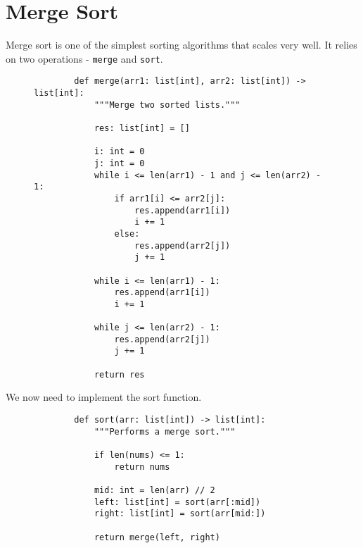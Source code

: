 
\section{Merge Sort}

Merge sort is one of the simplest sorting algorithms that scales very well. It
relies on two operations - \texttt{merge} and
\texttt{sort}.

\begin{figure}[H]
    \centering
    \begin{verbatim}
        def merge(arr1: list[int], arr2: list[int]) -> list[int]:
            """Merge two sorted lists."""

            res: list[int] = []

            i: int = 0
            j: int = 0
            while i <= len(arr1) - 1 and j <= len(arr2) - 1:
                if arr1[i] <= arr2[j]:
                    res.append(arr1[i])
                    i += 1
                else:
                    res.append(arr2[j])
                    j += 1
            
            while i <= len(arr1) - 1:
                res.append(arr1[i])
                i += 1

            while j <= len(arr2) - 1:
                res.append(arr2[j])
                j += 1

            return res
    \end{verbatim}
\end{figure}

We now need to implement the sort function.

\begin{figure}[H]
    \centering
    \begin{verbatim}
        def sort(arr: list[int]) -> list[int]:
            """Performs a merge sort."""

            if len(nums) <= 1:
                return nums
            
            mid: int = len(arr) // 2
            left: list[int] = sort(arr[:mid])
            right: list[int] = sort(arr[mid:])

            return merge(left, right)
    \end{verbatim}
\end{figure}

